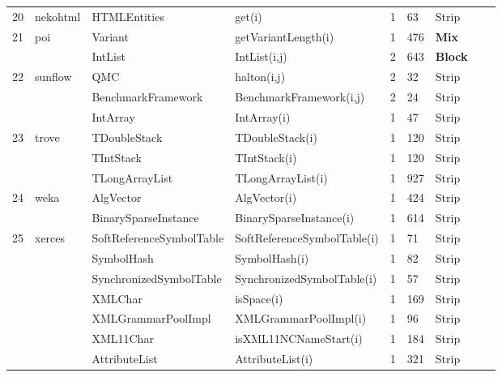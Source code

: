 \begin{table}[H]
{{\begin{tabular}{|l|l|l|l|l|l|l|l|l|}
20	&	nekohtml	& HTMLEntities			& get(i)					& 1			& 63	& Strip  										\\ 
21	&	poi			& Variant				& getVariantLength(i)		& 1			& 476	& {\bf Mix}  										\\ 
	&				& IntList					& IntList(i,j)				& 2			& 643	& {\bf Block} 										\\ 	
22	&	sunflow		& QMC					& halton(i,j)				& 2			& 32	& Strip  										\\ 
	&				& BenchmarkFramework	& BenchmarkFramework(i,j) & 2		& 24	& Strip   										\\ 
	&				& IntArray				& IntArray(i)				& 1			& 47	& Strip 										\\ 	
23	&	trove		& TDoubleStack			& TDoubleStack(i)		& 1			& 120	& Strip  										\\ 
	&				& TIntStack				& TIntStack(i)			& 1			& 120	& Strip  										\\ 
	&				& TLongArrayList			& TLongArrayList(i)		& 1			& 927	& Strip  										\\ 
24	&	weka		& AlgVector				& AlgVector(i)			& 1			& 424	& Strip  										\\ 
	&				& BinarySparseInstance	& BinarySparseInstance(i)  & 1			& 614	& Strip 										\\ 
25	&	xerces		& SoftReferenceSymbolTable& SoftReferenceSymbolTable(i) & 1	& 71	& Strip  										\\ 
	&				& SymbolHash			& SymbolHash(i)			& 1			& 82	& Strip 										\\ 
	&				& SynchronizedSymbolTable& SynchronizedSymbolTable(i) & 1	& 57	& Strip  										\\ 
	&				& XMLChar				& isSpace(i)				& 1			& 169	& Strip 										\\ 
	&				& XMLGrammarPoolImpl	& XMLGrammarPoolImpl(i)	& 1			& 96	& Strip   										\\ 
	&				& XML11Char			& isXML11NCNameStart(i)	& 1			& 184	& Strip  										\\ 
	&				& AttributeList			& AttributeList(i)			& 1			& 321	& Strip  										\\ 
\hline

\end{tabular}
}
}
\bigskip
\label{table:packages}
\end{table}




